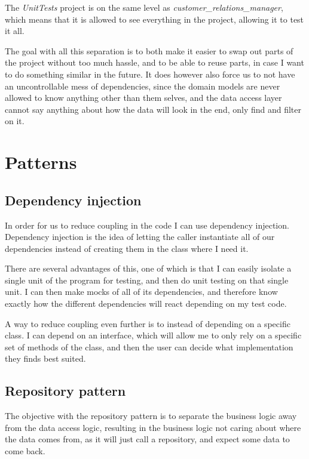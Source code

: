 The \textit{UnitTests} project is on the same level as \textit{customer\_relations\_manager}, which means that it is allowed to see everything in the project, allowing it to test it all.

The goal with all this separation is to both make it easier to swap out parts of the project without too much hassle, and to be able to reuse parts, in case I want to do something similar in the future. It does however also force us to not have an uncontrollable mess of dependencies, since the domain models are never allowed to know anything other than them selves, and the data access layer cannot say anything about how the data will look in the end, only find and filter on it.

\section{Patterns}
\label{sec:Patterns}

\subsection{Dependency injection}
\label{sub:Dependency injection}
In order for us to reduce coupling in the code I can use dependency injection. Dependency injection is the idea of letting the caller instantiate all of our dependencies instead of creating them in the class where I need it.

There are several advantages of this, one of which is that I can easily isolate a single unit of the program for testing, and then do unit testing on that single unit. I can then make mocks of all of its dependencies, and therefore know exactly how the different dependencies will react depending on my test code\cite{dependency_injection}.

A way to reduce coupling even further is to instead of depending on a specific class. I can depend on an interface, which will allow me to only rely on a specific set of methods of the class, and then the user can decide what implementation they finds best suited.

\subsection{Repository pattern}
\label{sub:Repository pattern}
The objective with the repository pattern is to separate the business logic away from the data access logic, resulting in the business logic not caring about where the data comes from, as it will just call a repository, and expect some data to come back.

